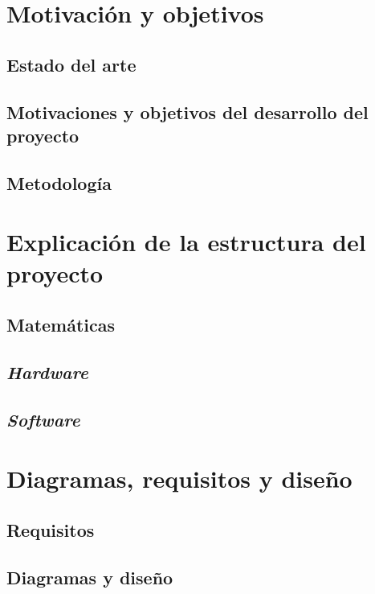\chapter{Motivación y objetivos}
\section{Estado del arte}

\section{Motivaciones y objetivos del desarrollo del proyecto}

\section{Metodología}
\label{sec:methodology}


\chapter{Explicación de la estructura del proyecto} 

\section{Matemáticas}

\section{\textit{Hardware}}

\section{\textit{Software}}


\chapter{Diagramas, requisitos y diseño}

\section{Requisitos}

\section{Diagramas y diseño}


